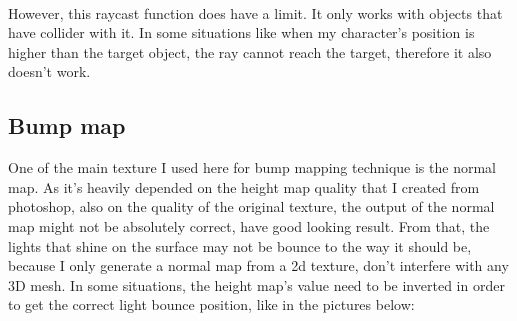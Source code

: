 \documentclass[a4paper, 13pt]{extarticle}
\begin{document}
{\begin{figure}[h!]
\begin{minipage}{.5\textwidth}
 		\label{fig:test42}
 		\end{minipage}
	 \end{figure} \\
	 However, this raycast function does have a limit. It only works with objects that have collider with it. In some situations like when my character's position is higher than the target object, the ray cannot reach the target, therefore it also doesn't work.
	
\subsection{Bump map} 	
	 One of the main texture I used here for bump mapping technique is the normal map. As it's heavily depended on the height map quality that I created from photoshop, also on the quality of the original texture, the output of the normal map might not be absolutely correct, have good looking result. From that, the lights that shine on the surface may not be bounce to the way it should be, because I only generate a normal map from a 2d texture, don't interfere with any 3D mesh. In some situations, the height map's value need to be inverted in order to get the correct light bounce position, like in the pictures below:
	 
}
\end{document}
